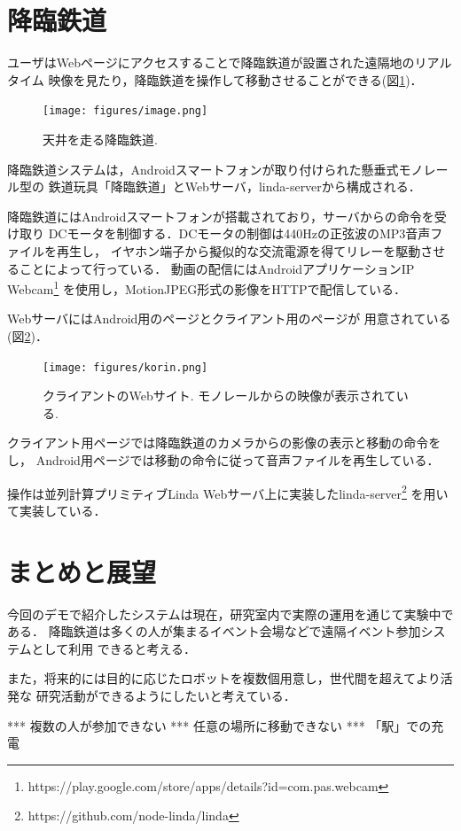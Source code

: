 \documentclass[submit,techreq]{ipsj}
\begin{document}
\section{降臨鉄道}

ユーザはWebページにアクセスすることで降臨鉄道が設置された遠隔地のリアルタイム
映像を見たり，降臨鉄道を操作して移動させることができる(図\ref{monorail})．

\begin{figure}[H]
\begin{center}
\texttt{[image: figures/image.png]}
\end{center}
\caption{天井を走る降臨鉄道.}
\label{monorail}
\end{figure}


降臨鉄道システムは，Androidスマートフォンが取り付けられた懸垂式モノレール型の
鉄道玩具「降臨鉄道」とWebサーバ，linda-serverから構成される．

降臨鉄道にはAndroidスマートフォンが搭載されており，サーバからの命令を受け取り
DCモータを制御する．DCモータの制御は440Hzの正弦波のMP3音声ファイルを再生し，
イヤホン端子から擬似的な交流電源を得てリレーを駆動させることによって行っている．
動画の配信にはAndroidアプリケーションIP Webcam\footnote{
  \textsf{https://play.google.com/store/apps/details?id=com.pas.webcam}
}
を使用し，MotionJPEG形式の影像をHTTPで配信している．

WebサーバにはAndroid用のページとクライアント用のページが
用意されている(図\ref{browser})．

\begin{figure}[H]
\begin{center}
\texttt{[image: figures/korin.png]}
\end{center}
\caption{クライアントのWebサイト. モノレールからの映像が表示されている.}
\label{browser}
\end{figure}

クライアント用ページでは降臨鉄道のカメラからの影像の表示と移動の命令をし，
Android用ページでは移動の命令に従って音声ファイルを再生している．

操作は並列計算プリミティブLinda\cite{Carriero:1989:LC:63334.63337}
Webサーバ上に実装したlinda-server\footnote{
  \textsf{https://github.com/node-linda/linda}
}
を用いて実装している．

\section{まとめと展望}

今回のデモで紹介したシステムは現在，研究室内で実際の運用を通じて実験中である．
降臨鉄道は多くの人が集まるイベント会場などで遠隔イベント参加システムとして利用
できると考える．

また，将来的には目的に応じたロボットを複数個用意し，世代間を超えてより活発な
研究活動ができるようにしたいと考えている．


*** 複数の人が参加できない *** 任意の場所に移動できない *** 「駅」での充電

{\scriptsize


}
\end{document}
